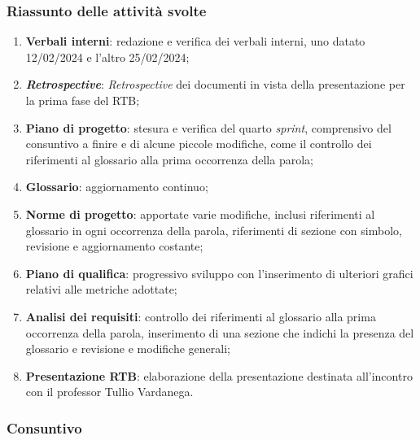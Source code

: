 \subsubsection{Riassunto delle attività svolte}
\begin{enumerate}
	\item \textbf{Verbali interni}: redazione e verifica dei verbali interni, uno datato 12/02/2024 e l'altro 25/02/2024;

	\item \textit{\textbf{Retrospective}}: \textit{Retrospective}  dei documenti in vista della presentazione per la prima fase del RTB;

	\item \textbf{Piano di progetto}: stesura e verifica del quarto \textit{sprint}, comprensivo del consuntivo a finire e di alcune piccole modifiche,
	      come il controllo dei riferimenti al glossario alla prima occorrenza della parola;

	\item \textbf{Glossario}: aggiornamento continuo;

	\item \textbf{Norme di progetto}: apportate varie modifiche, inclusi riferimenti al glossario in ogni occorrenza della parola,
	      riferimenti di sezione con simbolo, revisione e aggiornamento costante;

	\item \textbf{Piano di qualifica}: progressivo sviluppo con l'inserimento di ulteriori grafici relativi alle metriche adottate;

	\item \textbf{Analisi dei requisiti}: controllo dei riferimenti al glossario alla prima occorrenza della parola, inserimento di una sezione che indichi la presenza del glossario e revisione e modifiche generali;

	\item \textbf{Presentazione RTB}: elaborazione della presentazione destinata all'incontro con il professor Tullio Vardanega.
\end{enumerate}

\subsubsection{Consuntivo}

